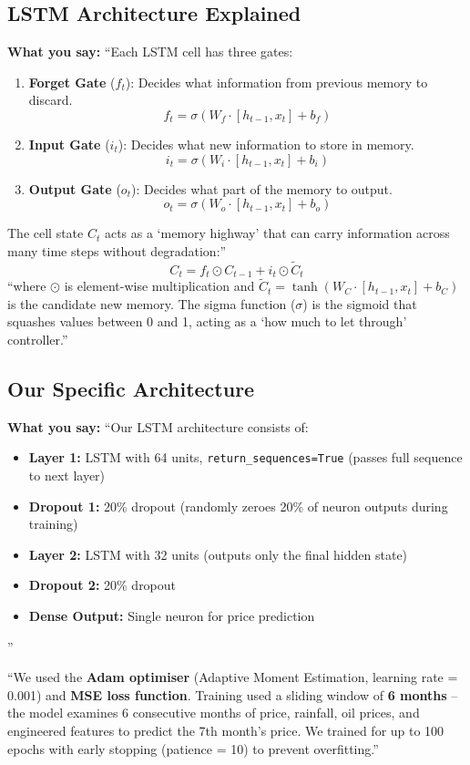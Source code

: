 \documentclass[11pt,a4paper]{article}
\begin{document}
\subsection{LSTM Architecture Explained}
\textbf{What you say:}
``Each LSTM cell has three gates:
\begin{enumerate}
    \item \textbf{Forget Gate} ($f_t$): Decides what information from previous memory to discard.
    $$f_t = \sigma(W_f \cdot [h_{t-1}, x_t] + b_f)$$
    \item \textbf{Input Gate} ($i_t$): Decides what new information to store in memory.
    $$i_t = \sigma(W_i \cdot [h_{t-1}, x_t] + b_i)$$
    \item \textbf{Output Gate} ($o_t$): Decides what part of the memory to output.
    $$o_t = \sigma(W_o \cdot [h_{t-1}, x_t] + b_o)$$
\end{enumerate}
The cell state $C_t$ acts as a `memory highway' that can carry information across many time steps without degradation:''
$$C_t = f_t \odot C_{t-1} + i_t \odot \tilde{C}_t$$
``where $\odot$ is element-wise multiplication and $\tilde{C}_t = \tanh(W_C \cdot [h_{t-1}, x_t] + b_C)$ is the candidate new memory. The sigma function ($\sigma$) is the sigmoid that squashes values between 0 and 1, acting as a `how much to let through' controller.''

\subsection{Our Specific Architecture}
\textbf{What you say:}
``Our LSTM architecture consists of:
\begin{itemize}
    \item \textbf{Layer 1:} LSTM with 64 units, \texttt{return\_sequences=True} (passes full sequence to next layer)
    \item \textbf{Dropout 1:} 20\% dropout (randomly zeroes 20\% of neuron outputs during training)
    \item \textbf{Layer 2:} LSTM with 32 units (outputs only the final hidden state)
    \item \textbf{Dropout 2:} 20\% dropout
    \item \textbf{Dense Output:} Single neuron for price prediction
\end{itemize}''

``We used the \textbf{Adam optimiser} (Adaptive Moment Estimation, learning rate = 0.001) and \textbf{MSE loss function}. Training used a sliding window of \textbf{6 months} -- the model examines 6 consecutive months of price, rainfall, oil prices, and engineered features to predict the 7th month's price. We trained for up to 100 epochs with early stopping (patience = 10) to prevent overfitting.''
\end{document}
